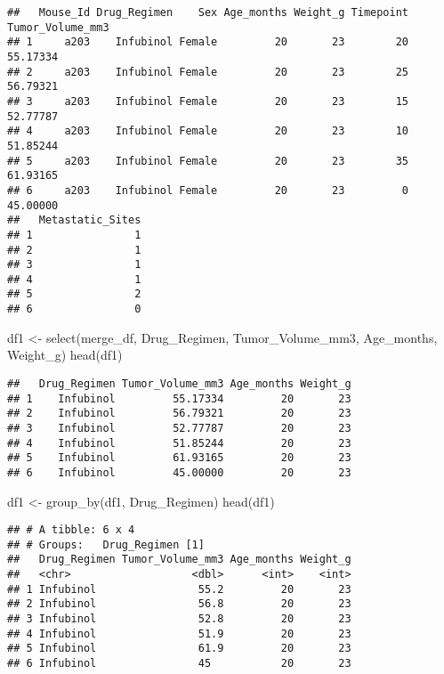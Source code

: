 \documentclass[
]{article}
\newenvironment{Shaded}{\begin{snugshade}}{\end{snugshade}}
\newcommand{\FunctionTok}[1]{\textcolor[rgb]{0.00,0.00,0.00}{#1}}
\newcommand{\NormalTok}[1]{#1}
\newcommand{\OtherTok}[1]{\textcolor[rgb]{0.56,0.35,0.01}{#1}}
\begin{document}
\begin{verbatim}
##   Mouse_Id Drug_Regimen    Sex Age_months Weight_g Timepoint Tumor_Volume_mm3
## 1     a203    Infubinol Female         20       23        20         55.17334
## 2     a203    Infubinol Female         20       23        25         56.79321
## 3     a203    Infubinol Female         20       23        15         52.77787
## 4     a203    Infubinol Female         20       23        10         51.85244
## 5     a203    Infubinol Female         20       23        35         61.93165
## 6     a203    Infubinol Female         20       23         0         45.00000
##   Metastatic_Sites
## 1                1
## 2                1
## 3                1
## 4                1
## 5                2
## 6                0
\end{verbatim}

\begin{Shaded}
\begin{Highlighting}[]
\NormalTok{df1 }\OtherTok{\textless{}{-}} \FunctionTok{select}\NormalTok{(merge\_df, Drug\_Regimen, Tumor\_Volume\_mm3, Age\_months, Weight\_g)}
\FunctionTok{head}\NormalTok{(df1)}
\end{Highlighting}
\end{Shaded}

\begin{verbatim}
##   Drug_Regimen Tumor_Volume_mm3 Age_months Weight_g
## 1    Infubinol         55.17334         20       23
## 2    Infubinol         56.79321         20       23
## 3    Infubinol         52.77787         20       23
## 4    Infubinol         51.85244         20       23
## 5    Infubinol         61.93165         20       23
## 6    Infubinol         45.00000         20       23
\end{verbatim}

\begin{Shaded}
\begin{Highlighting}[]
\NormalTok{df1 }\OtherTok{\textless{}{-}} \FunctionTok{group\_by}\NormalTok{(df1, Drug\_Regimen)}
\FunctionTok{head}\NormalTok{(df1)}
\end{Highlighting}
\end{Shaded}

\begin{verbatim}
## # A tibble: 6 x 4
## # Groups:   Drug_Regimen [1]
##   Drug_Regimen Tumor_Volume_mm3 Age_months Weight_g
##   <chr>                   <dbl>      <int>    <int>
## 1 Infubinol                55.2         20       23
## 2 Infubinol                56.8         20       23
## 3 Infubinol                52.8         20       23
## 4 Infubinol                51.9         20       23
## 5 Infubinol                61.9         20       23
## 6 Infubinol                45           20       23
\end{verbatim}
\end{document}
